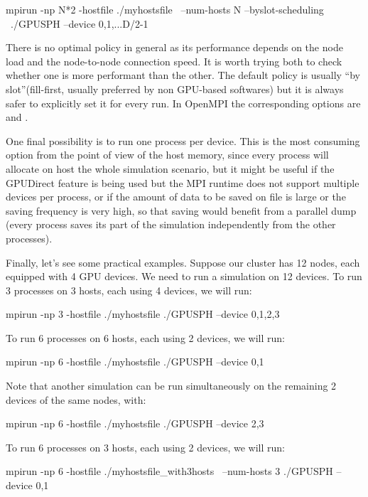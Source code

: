\documentclass{../GPUSPHtemplate}
\begin{document}
\begin{shellcode}
mpirun -np N*2 -hostfile ./myhostsfile \
--num-hosts N --byslot-scheduling \
./GPUSPH --device 0,1,...D/2-1
\end{shellcode}

There is no optimal policy in general as its performance depends on the node 
load and the node-to-node connection speed. It is worth trying both to check 
whether one is more performant than the other. The default policy is usually 
``by slot''(fill-first, usually preferred by non GPU-based softwares) but it
is always safer to explicitly set it for every run. 
In OpenMPI the corresponding options are \cmd{--byslot} and \cmd{--bynode}.

One final possibility is to run one process per device. This is the most 
consuming option from the point of view of the host memory, since every process 
will allocate on host the whole simulation scenario, but it might be useful if the 
GPUDirect feature is being used but the MPI runtime does not support multiple 
devices per process, or if the amount of data to be saved on file is large or 
the saving frequency is very high, so that saving would benefit from a parallel 
dump (every process saves its part of the simulation independently from the other processes).

Finally, let's see some practical examples. Suppose our cluster has 12 nodes, each equipped
with 4 GPU devices. We need to run a simulation on 12 devices. 
To run 3 processes on 3 hosts, each using 4 devices, we will run:

\begin{shellcode}
mpirun -np 3 -hostfile ./myhostsfile ./GPUSPH --device 0,1,2,3
\end{shellcode}

To run 6 processes on 6 hosts, each using 2 devices, we will run:

\begin{shellcode}
mpirun -np 6 -hostfile ./myhostsfile ./GPUSPH --device 0,1
\end{shellcode}

Note that another simulation can be run simultaneously on the remaining 2 devices of the same nodes, with:
\begin{shellcode}
mpirun -np 6 -hostfile ./myhostsfile ./GPUSPH --device 2,3
\end{shellcode}

To run 6 processes on 3 hosts, each using 2 devices, we will run:

\begin{shellcode}
mpirun -np 6 -hostfile ./myhostsfile_with3hosts \
--num-hosts 3 ./GPUSPH --device 0,1
\end{shellcode}
\end{document}
